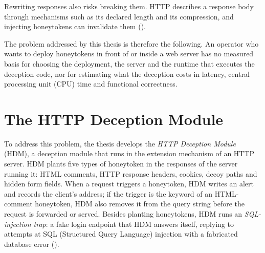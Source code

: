 \documentclass{rptuma}
\begin{document}
Rewriting responses also risks breaking them. HTTP describes a response body through mechanisms
such as its declared length and its compression, and injecting honeytokens can invalidate them
().

The problem addressed by this thesis is therefore the following. An operator who wants to deploy
honeytokens in front of or inside a web server has no measured basis for choosing the deployment,
the server and the runtime that executes the deception code, nor for estimating what the deception
costs in latency, central processing unit (CPU) time and functional correctness.

\section{The HTTP Deception Module}
\label{sec:intro.hdm}

To address this problem, the thesis develops the \emph{HTTP Deception Module} (HDM), a deception
module that runs in the extension mechanism of an HTTP server. HDM plants five types of honeytoken
in the responses of the server running it: HTML comments, HTTP response headers, cookies, decoy
paths and hidden form fields. When a request triggers a honeytoken, HDM writes an alert and records
the client's address; if the trigger is the keyword of an HTML-comment honeytoken, HDM also removes
it from the query string before the request is forwarded or served. Besides planting honeytokens,
HDM runs an \emph{SQL-injection trap}: a fake login endpoint that HDM answers itself, replying to
attempts at SQL (Structured Query Language) injection with a fabricated database error
().
\end{document}
